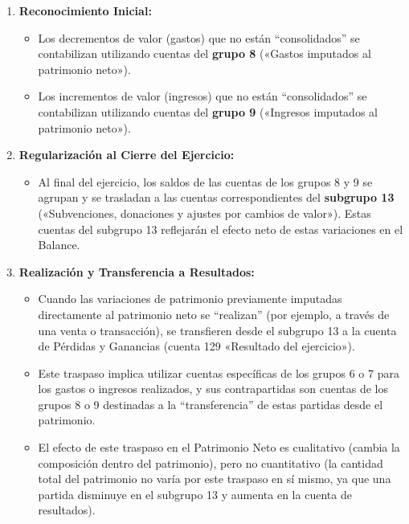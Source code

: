 \documentclass[
  paper=a4,
  ,captions=tableheading
]{scrbook}
\providecommand{\tightlist}{%
  \setlength{\itemsep}{0pt}\setlength{\parskip}{0pt}}
\begin{document}
\begin{enumerate}
\def\labelenumi{\arabic{enumi}.}
\tightlist
\item
  \textbf{Reconocimiento Inicial:}

  \begin{itemize}
  \tightlist
  \item
    Los decrementos de valor (gastos) que no están ``consolidados'' se
    contabilizan utilizando cuentas del \textbf{grupo 8} («Gastos
    imputados al patrimonio neto»).
  \item
    Los incrementos de valor (ingresos) que no están ``consolidados'' se
    contabilizan utilizando cuentas del \textbf{grupo 9} («Ingresos
    imputados al patrimonio neto»).
  \end{itemize}
\item
  \textbf{Regularización al Cierre del Ejercicio:}

  \begin{itemize}
  \tightlist
  \item
    Al final del ejercicio, los saldos de las cuentas de los grupos 8 y
    9 se agrupan y se trasladan a las cuentas correspondientes del
    \textbf{subgrupo 13} («Subvenciones, donaciones y ajustes por
    cambios de valor»). Estas cuentas del subgrupo 13 reflejarán el
    efecto neto de estas variaciones en el Balance.
  \end{itemize}
\item
  \textbf{Realización y Transferencia a Resultados:}

  \begin{itemize}
  \tightlist
  \item
    Cuando las variaciones de patrimonio previamente imputadas
    directamente al patrimonio neto se ``realizan'' (por ejemplo, a
    través de una venta o transacción), se transfieren desde el subgrupo
    13 a la cuenta de Pérdidas y Ganancias (cuenta 129 «Resultado del
    ejercicio»).
  \item
    Este traspaso implica utilizar cuentas específicas de los grupos 6 o
    7 para los gastos o ingresos realizados, y sus contrapartidas son
    cuentas de los grupos 8 o 9 destinadas a la ``transferencia'' de
    estas partidas desde el patrimonio.
  \item
    El efecto de este traspaso en el Patrimonio Neto es cualitativo
    (cambia la composición dentro del patrimonio), pero no cuantitativo
    (la cantidad total del patrimonio no varía por este traspaso en sí
    mismo, ya que una partida disminuye en el subgrupo 13 y aumenta en
    la cuenta de resultados).
  \end{itemize}
\end{enumerate}
\end{document}
